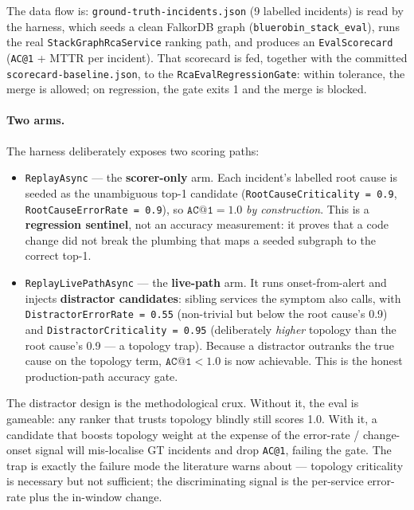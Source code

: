 \documentclass[11pt]{article}
\makeatletter
\newcommand{\acone}{\texttt{AC@1}}
\newcommand{\code}[1]{\texttt{#1}}
\makeatother
\begin{document}
The data flow is: \code{ground-truth-incidents.json} (9 labelled incidents) is read by the
harness, which seeds a clean FalkorDB graph (\code{bluerobin\_stack\_eval}), runs the real
\code{StackGraphRcaService} ranking path, and produces an \code{EvalScorecard}
(\acone{} + MTTR per incident). That scorecard is fed, together with the committed
\code{scorecard-baseline.json}, to the \code{RcaEvalRegressionGate}: within tolerance, the
merge is allowed; on regression, the gate exits 1 and the merge is blocked.

\paragraph{Two arms.}
The harness deliberately exposes two scoring paths:

\begin{itemize}
  \item \code{ReplayAsync} --- the \textbf{scorer-only} arm. Each incident's labelled root
  cause is seeded as the unambiguous top-1 candidate (\code{RootCauseCriticality = 0.9},
  \code{RootCauseErrorRate = 0.9}), so $\acone{} = 1.0$ \emph{by construction}. This is a
  \textbf{regression sentinel}, not an accuracy measurement: it proves that a code change
  did not break the plumbing that maps a seeded subgraph to the correct top-1.
  \item \code{ReplayLivePathAsync} --- the \textbf{live-path} arm. It runs onset-from-alert
  and injects \textbf{distractor candidates}: sibling services the symptom also calls, with
  \code{DistractorErrorRate = 0.55} (non-trivial but below the root cause's 0.9) and
  \code{DistractorCriticality = 0.95} (deliberately \emph{higher} topology than the root
  cause's 0.9 --- a topology trap). Because a distractor outranks the true cause on the
  topology term, $\acone{} < 1.0$ is now achievable. This is the honest production-path
  accuracy gate.
\end{itemize}

The distractor design is the methodological crux. Without it, the eval is gameable: any
ranker that trusts topology blindly still scores 1.0. With it, a candidate that boosts
topology weight at the expense of the error-rate / change-onset signal will mis-localise GT
incidents and drop \acone{}, failing the gate. The trap is exactly the failure mode the
literature warns about --- topology criticality is necessary but not sufficient; the
discriminating signal is the per-service error-rate plus the in-window change.
\end{document}
